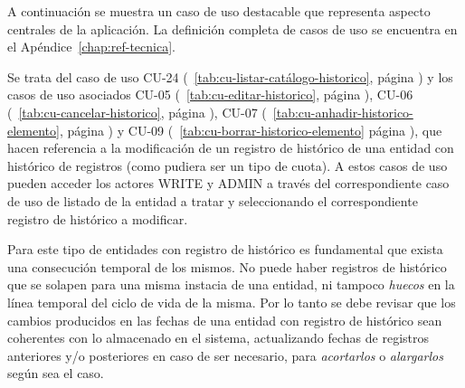 A continuación se muestra un caso de uso destacable que representa
aspecto centrales de la aplicación. La definición completa de casos de uso se encuentra en el Apéndice~\ref{chap:ref-tecnica}. 

Se trata del caso de uso CU-24 (\tablename~\ref{tab:cu-listar-catálogo-historico}, página \pageref{tab:cu-listar-catálogo-historico}) y los casos de uso asociados  CU-05 (\tablename~\ref{tab:cu-editar-historico}, página \pageref{tab:cu-editar-historico}), CU-06 (\tablename~\ref{tab:cu-cancelar-historico}, página \pageref{tab:cu-cancelar-historico}), CU-07 (\tablename~\ref{tab:cu-anhadir-historico-elemento}, página \pageref{tab:cu-anhadir-historico-elemento}) y CU-09 (\tablename~\ref{tab:cu-borrar-historico-elemento} página \pageref{tab:cu-borrar-historico-elemento}), que hacen referencia a la modificación de un registro de histórico de una entidad con histórico de registros (como pudiera ser un tipo de cuota). A estos casos de uso pueden acceder los actores WRITE y ADMIN a través del correspondiente caso de uso de listado de la entidad a tratar y seleccionando el correspondiente registro de histórico a modificar.

Para este tipo de entidades con registro de histórico es fundamental que exista una consecución temporal de los mismos. No puede haber registros de histórico que se solapen para una misma instacia de una entidad, ni tampoco \textit{huecos} en la línea temporal del ciclo de vida de la misma. Por lo tanto se debe revisar que los cambios producidos en las fechas de una entidad con registro de histórico sean coherentes con lo almacenado en el sistema, actualizando fechas de registros anteriores y/o posteriores en caso de ser necesario, para \textit{acortarlos} o \textit{alargarlos} según sea el caso.



